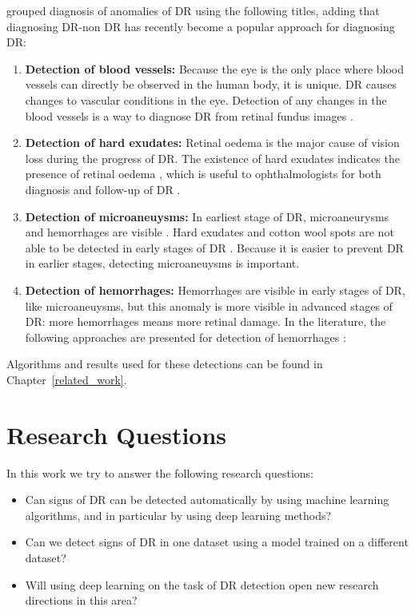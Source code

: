 \citet{rocha2011points} grouped diagnosis of anomalies of DR using the following titles, adding that diagnosing DR-non DR has recently become a popular approach for diagnosing DR:  
\begin{enumerate}
    \item \textbf{Detection of blood vessels:}  Because the eye is the only place where blood vessels can directly be observed in the human body, it is unique. DR causes changes to vascular conditions in the eye. Detection of any changes in the blood vessels is a way to diagnose DR from retinal fundus images \citep{mendonca2006segmentation}.
    \item \textbf{Detection of hard exudates:} Retinal oedema is the major cause of vision loss during the progress of DR. The existence of hard exudates indicates the presence of retinal oedema \citep{singer1992screening}, which is useful to ophthalmologists for both diagnosis and follow-up of DR \citep{garcia2009neural}.
    \item \textbf{Detection of microaneuysms:} In earliest stage of DR, microaneurysms and hemorrhages are visible \citep{doi:10.1056/NEJMra021678}. Hard exudates and cotton wool spots are not able to be detected in early stages of DR \citep{navarro2016automatic}. Because it is easier to prevent DR in earlier stages, detecting microaneuysms is important.
    \item \textbf{Detection of hemorrhages:} Hemorrhages are visible in early stages of DR, like microaneuysms, but this anomaly is more visible in advanced stages of DR: more hemorrhages means more retinal damage. In the literature, the following approaches are presented for detection of hemorrhages \citep{rocha2011points}:
\end{enumerate}

Algorithms and results used for these detections can be found in Chapter~\ref{related_work}.

\section{Research Questions}
In this work we try to answer the following research questions:

\begin{itemize}
    \item Can signs of DR can be detected automatically by using machine learning algorithms, and in particular by using deep learning methods?
    \item Can we detect signs of DR in one dataset using a model trained on a different dataset?
    \item Will using deep learning on the task of DR detection open new research directions in this area? 
\end{itemize}

